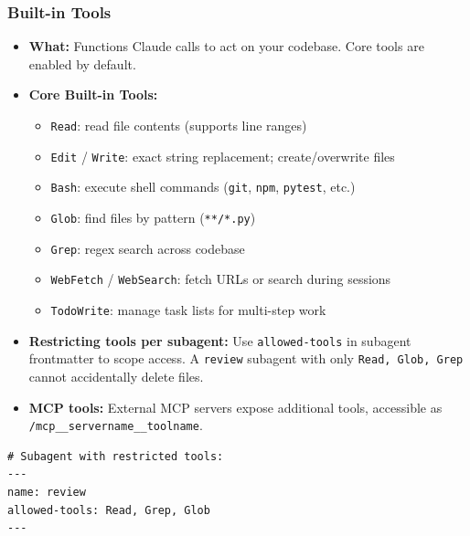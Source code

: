 \begin{frame}[fragile]\frametitle{Built-in Tools}
  \begin{itemize}
    \item \textbf{What:} Functions Claude calls to act on your codebase. Core tools are enabled by default.
    \item \textbf{Core Built-in Tools:}
      \begin{itemize}
        \item \texttt{Read}: read file contents (supports line ranges)
        \item \texttt{Edit} / \texttt{Write}: exact string replacement; create/overwrite files
        \item \texttt{Bash}: execute shell commands (\texttt{git}, \texttt{npm}, \texttt{pytest}, etc.)
        \item \texttt{Glob}: find files by pattern (\texttt{**/*.py})
        \item \texttt{Grep}: regex search across codebase
        \item \texttt{WebFetch} / \texttt{WebSearch}: fetch URLs or search during sessions
        \item \texttt{TodoWrite}: manage task lists for multi-step work
      \end{itemize}
    \item \textbf{Restricting tools per subagent:} Use \texttt{allowed-tools} in subagent frontmatter to scope access. A \texttt{review} subagent with only \texttt{Read, Glob, Grep} cannot accidentally delete files.
    \item \textbf{MCP tools:} External MCP servers expose additional tools, accessible as \texttt{/mcp\_\_servername\_\_toolname}.
  \end{itemize}

\begin{lstlisting}
# Subagent with restricted tools:
---
name: review
allowed-tools: Read, Grep, Glob
---
\end{lstlisting}
\end{frame}


